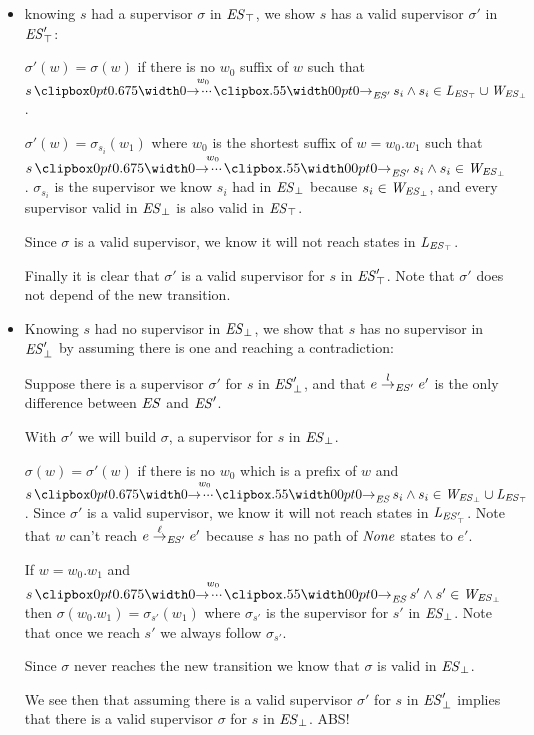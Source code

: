 \begin{itemize}
	\item knowing $s$ had a supervisor $\sigma$ in $\mathit{\mathit{ES}_{\top}}$, we show $s$ has a valid supervisor $\sigma'$ in $\mathit{\mathit{ES}'_{\top}}$:
	
	$\sigma'(w) = \sigma(w)$ if there is no $w_0$ suffix of $w$ such that $ s \runw{w_0}{\structure'} s_i \wedge s_i \in \LES \cup \WES$. 
	
	$\sigma'(w) = \sigma_{s_i}(w_1)$ where $w_0$ is the shortest suffix of $w = w_0.w_1$ such that $ s \runw{w_0}{\structure'} s_i \wedge s_i \in \WES$. $\sigma_{s_i}$ is the supervisor we know $s_i$ had in $\mathit{\mathit{ES}_{\bot}}$ because $s_i \in \mathit{W_{\mathit{\mathit{ES}_{\bot}}}}$, and every supervisor valid in $\mathit{\mathit{ES}_{\bot}}$ is also valid in $\mathit{\mathit{ES}_{\top}}$.
	
	Since $\sigma$ is a valid supervisor, we know it will not reach states in $\mathit{L_{\mathit{\mathit{ES}_{\top}}}}$.
	
	Finally it is clear that $\sigma'$ is a valid supervisor for $s$ in $\mathit{\mathit{ES}'_{\top}}$. Note that $\sigma'$ does not depend of the new transition.
	
	
	
	
	\item Knowing $s$ had no supervisor in $\mathit{\mathit{ES}_{\bot}}$, we show that $s$ has no supervisor in $\mathit{\mathit{ES}'_{\bot}}$ by assuming there is one and reaching a contradiction:
	
	Suppose there is a supervisor $\sigma'$ for $s$ in $\mathit{\mathit{ES}'_{\bot}}$, and that $e \overset{l}{\rightarrow}_{\mathit{ES}'} e'$ is the only difference between $\mathit{ES}$ and $\mathit{ES}'$.
	
	With $\sigma'$ we will build $\sigma$, a supervisor for $s$ in $\mathit{\mathit{ES}_{\bot}}$.
	
	$\sigma(w) = \sigma'(w)$ if there is no $w_0$ which is a prefix of $w$ and $s \runw{w_0}{\structure} s_i \wedge s_i \in \WES \cup \LES$. Since $\sigma'$ is a valid supervisor, we know it will not reach states in $\mathit{L_{\mathit{\mathit{ES}'_{\top}}}}$. Note that $w$ can't reach $e \overset{\ell}{\rightarrow}_{\mathit{ES}'} e'$ because $s$ has no path of $\mathit{None}$ states to $e'$.
	
	If $w=w_0.w_1$ and $s \runw{w_0}{\structure} s' \wedge s' \in \WES$ then $\sigma(w_0.w_1) = \sigma_{s'}(w_1)$ where $\sigma_{s'}$ is the supervisor for $s'$ in $\mathit{\mathit{ES}_{\bot}}$. Note that once we reach $s'$ we always follow $\sigma_{s'}$.
	
	Since $\sigma$ never reaches the new transition we know that $\sigma$ is valid in $\mathit{\mathit{ES}_{\bot}}$.
		
	We see then that assuming there is a valid supervisor $\sigma'$ for $s$ in $\mathit{\mathit{ES}'_{\bot}}$ implies that there is a valid supervisor $\sigma$ for $s$ in $\mathit{\mathit{ES}_{\bot}}$. ABS! \\
	
\end{itemize}



